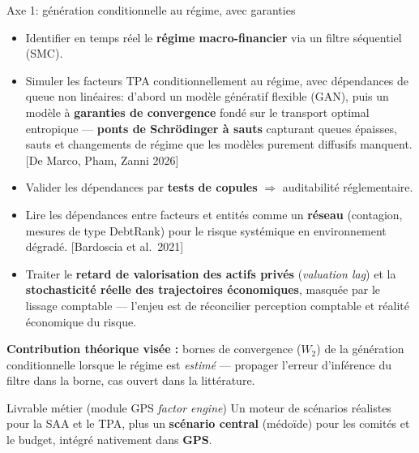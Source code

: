 \documentclass[aspectratio=169,11pt]{beamer}
\newcommand{\highlight}[1]{\textcolor{GeneraliRed}{\textbf{#1}}}
\newcommand{\source}[1]{{\scriptsize\textcolor{Slate!65}{[#1]}}}
\begin{document}
\begin{frame}[shrink=20]{Axe 1: génération conditionnelle au régime, avec garanties}
  \begin{itemize}
    \item Identifier en temps réel le \highlight{régime macro-financier} via un filtre séquentiel (SMC).
    \item Simuler les facteurs TPA conditionnellement au régime, avec dépendances de queue non linéaires: d'abord un modèle génératif flexible (GAN), puis un modèle à \highlight{garanties de convergence} fondé sur le transport optimal entropique — \highlight{ponts de Schrödinger à sauts} capturant queues épaisses, sauts et changements de régime que les modèles purement diffusifs manquent. \source{De Marco, Pham, Zanni 2026}
    \item Valider les dépendances par \highlight{tests de copules} $\Rightarrow$ auditabilité réglementaire.
    \item Lire les dépendances entre facteurs et entités comme un \highlight{réseau} (contagion, mesures de type DebtRank) pour le risque systémique en environnement dégradé. \source{Bardoscia et al.\ 2021}
    \item Traiter le \highlight{retard de valorisation des actifs privés} (\emph{valuation lag}) et la \highlight{stochasticité réelle des trajectoires économiques}, masquée par le lissage comptable — l'enjeu est de réconcilier perception comptable et réalité économique du risque.
  \end{itemize}

  \vspace{0.1cm}
  {\footnotesize \highlight{Contribution théorique visée :} bornes de convergence ($W_2$) de la génération conditionnelle lorsque le régime est \emph{estimé} — propager l'erreur d'inférence du filtre dans la borne, cas ouvert dans la littérature.}

  \begin{block}{Livrable métier (module GPS \textemdash{} \textit{factor engine})}
    Un moteur de scénarios réalistes pour la SAA et le TPA, plus un \highlight{scénario central} (médoïde) pour les comités et le budget, intégré nativement dans \highlight{GPS}.
  \end{block}
\end{frame}
\end{document}
